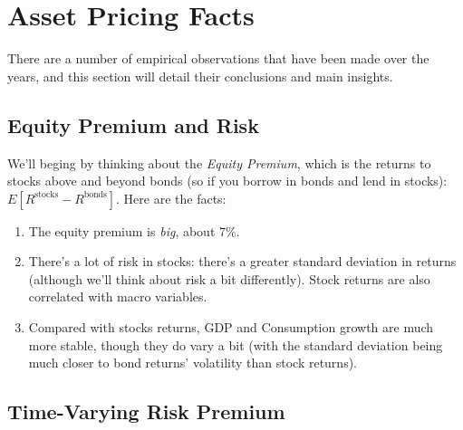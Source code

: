 \documentclass[a4paper,12pt]{scrartcl}
\begin{document}
\section{Asset Pricing Facts}

There are a number of empirical observations that have been made
over the years, and this section will detail their conclusions
and main insights.

\subsection{Equity Premium and Risk}

We'll beging by thinking about the \emph{Equity Premium}, which
is the returns to stocks above and beyond bonds (so if you borrow
in bonds and lend in stocks): $E[R^{\text{stocks}}-R^{\text{bonds}}]$.
Here are the facts:
\begin{enumerate}
    \item The equity premium is \emph{big}, about 7\%.
    \item There's a lot of risk in stocks: there's a greater
	standard deviation in returns (although we'll think about
	risk a bit differently). Stock returns are also correlated
	with macro variables.
    \item Compared with stocks returns, GDP and Consumption growth are much
	more stable, though they do vary a bit (with the standard deviation
	being much closer to bond returns' volatility than stock returns).
\end{enumerate}

\subsection{Time-Varying Risk Premium}
\end{document}
